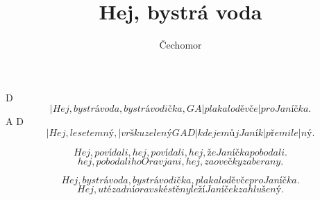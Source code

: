 \documentclass{song}
\title{Hej, bystrá voda}
\author{Čechomor}
\begin{document}
\strophe
   D
\[ |Hej, bystrá voda, bystrá vodička,
G              A
|plakalo děvče |pro Janíčka. \]
   A                 D
\[ |Hej, lese temný, |vršku zelený
G                 A       D
|kde je můj Janík |přemile|ný. \]
\endstrophe

\strophe*
\[ Hej, povídali, hej, povídali,
hej, že Janíčka pobodali. \]
\[ hej, pobodali ho Oravjani,
hej, za ovečky za berany. \]
\endstrophe

\strophe*
\[ Hej, bystrá voda, bystrá vodička,
plakalo děvče pro Janíčka. \]
\[ Hej, u té zadní oravské stěny
leží Janíček zahlušený. \]
\endstrophe
\end{document}
